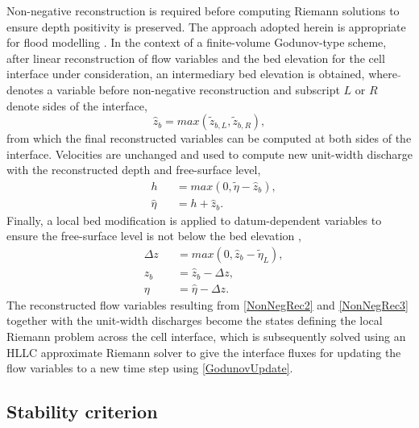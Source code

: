 \documentclass[11pt,english,a4paper]{article}
\begin{document}
Non-negative reconstruction is required before computing Riemann solutions to ensure depth positivity is preserved. The approach adopted herein is appropriate for flood modelling \cite{Liang_10}. In the context of a finite-volume Godunov-type scheme, after linear reconstruction of flow variables and the bed elevation for the cell interface under consideration, an intermediary bed elevation is obtained, where \(\tilde{ }\) denotes a variable before non-negative reconstruction and subscript \(L\) or \(R\) denote sides of the interface,
\begin{equation}
	\label{NonNegRec1}
	\hat{z}_b = max(\tilde{z}_{b,L}, \tilde{z}_{b,R}) ,
\end{equation}
from which the final reconstructed variables can be computed at both sides of the interface. Velocities are unchanged and used to compute new unit-width discharge with the reconstructed depth and free-surface level,
\begin{equation}
	\label{NonNegRec2}
	\begin{alignedat}{2}
		&h && = max(0, \tilde{\eta} - \hat{z}_b) ,\\
		&\hat{\eta} && = h + \hat{z}_b .
	\end{alignedat}
\end{equation}
Finally, a local bed modification is applied to datum-dependent variables to ensure the free-surface level is not below the bed elevation \cite{Liang_10},
\begin{equation}
	\label{NonNegRec3}
	\begin{alignedat}{2}
		&\Delta z && = max(0, \hat{z}_b - \tilde{\eta}_L) ,\\
		&z_b      && = \hat{z}_b - \Delta z               ,\\
		&\eta     && = \hat{\eta} - \Delta z              .
	\end{alignedat}
\end{equation}
The reconstructed flow variables resulting from \eqref{NonNegRec2} and \eqref{NonNegRec3} together with the unit-width discharges become the states defining the local Riemann problem across the cell interface, which is subsequently solved using an HLLC approximate Riemann solver to give the interface fluxes for updating the flow variables to a new time step using \eqref{GodunovUpdate}.

\subsection{Stability criterion}
\end{document}
